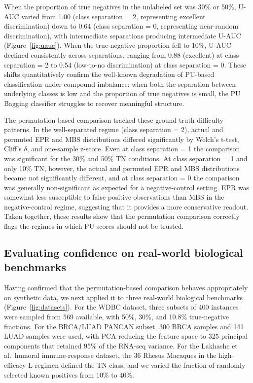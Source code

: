 \documentclass[11pt]{article}
\begin{document}
When the proportion of true negatives in the unlabeled set was 30\% or 50\%, U-AUC varied from 1.00 (class separation = 2, representing excellent discrimination) down to 0.64 (class separation = 0, representing near-random discrimination), with intermediate separations producing intermediate U-AUC (Figure~\ref{fig:uauc}). When the true-negative proportion fell to 10\%, U-AUC declined consistently across separations, ranging from 0.88 (excellent) at class separation = 2 to 0.54 (low-to-no discrimination) at class separation = 0. These shifts quantitatively confirm the well-known degradation of PU-based classification under compound imbalance: when both the separation between underlying classes is low and the proportion of true negatives is small, the PU Bagging classifier struggles to recover meaningful structure.

The permutation-based comparison tracked these ground-truth difficulty patterns. In the well-separated regime (class separation = 2), actual and permuted EPR and MBS distributions differed significantly by Welch's t-test, Cliff's $\delta$, and one-sample z-score. Even at class separation = 1 the comparison was significant for the 30\% and 50\% TN conditions. At class separation = 1 and only 10\% TN, however, the actual and permuted EPR and MBS distributions became not significantly different, and at class separation = 0 the comparison was generally non-significant as expected for a negative-control setting. EPR was somewhat less susceptible to false positive observations than MBS in the negative-control regime, suggesting that it provides a more conservative readout. Taken together, these results show that the permutation comparison correctly flags the regimes in which PU scores should not be trusted.

\subsection{Evaluating confidence on real-world biological benchmarks}

Having confirmed that the permutation-based comparison behaves appropriately on synthetic data, we next applied it to three real-world biological benchmarks (Figure~\ref{fig:datasets}). For the WDBC dataset, three subsets of 400 instances were sampled from 569 available, with 50\%, 30\%, and 10.8\% true-negative fractions. For the BRCA/LUAD PANCAN subset, 300 BRCA samples and 141 LUAD samples were used, with PCA reducing the feature space to 325 principal components that retained 95\% of the RNA-seq variance. For the Lakhashe et al.\ humoral immune-response dataset, the 36 Rhesus Macaques in the high-efficacy L regimen defined the TN class, and we varied the fraction of randomly selected known positives from 10\% to 40\%.
\end{document}

